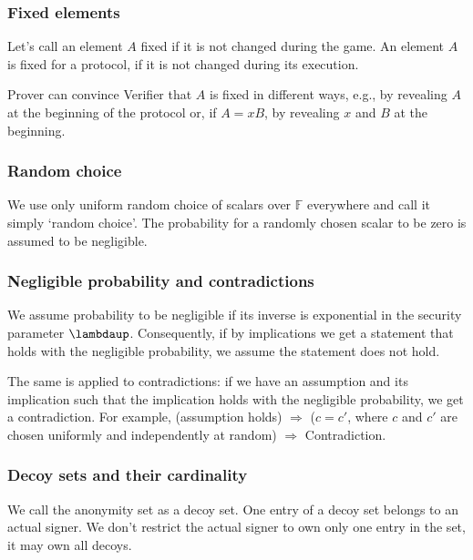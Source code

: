 \documentclass{mathcryptology} %
\theoremstyle{title}
\theoremstyle{titleof}
\begin{document}
\subsubsection{Fixed elements}
    Let's call an element $A$ fixed if it is not changed during the game. An element $A$ is fixed for a protocol, if it is not changed during its execution.

    Prover can convince Verifier that $A$ is fixed in different ways, e.g., by revealing $A$ at the beginning of the protocol or, if $A=xB$, by revealing $x$ and $B$ at the beginning.


\subsubsection{Random choice}
    We use only uniform random choice of scalars over $\mathds{F}$ everywhere and call it simply `random choice'. The probability for a randomly chosen scalar to be zero is assumed to be negligible.


\subsubsection{Negligible probability and contradictions}
    We assume probability to be negligible if its inverse is exponential in the security parameter $\bm{\lambdaup}$. Consequently, if by implications we get a statement that holds with the negligible probability, we assume the statement does not hold.

    The same is applied to contradictions: if we have an assumption and its implication such that the implication holds with the negligible probability, we get a contradiction. For example, (assumption holds) $\Rightarrow$ ($c=c'$, where $c$ and $c'$ are chosen uniformly and independently at random) $\Rightarrow$ Contradiction.


\subsubsection{Decoy sets and their cardinality}
    We call the anonymity set as a decoy set. One entry of a decoy set belongs to an actual signer. We don't restrict the actual signer to own only one entry in the set, it may own all decoys.
\end{document}
